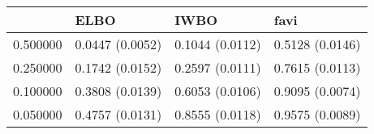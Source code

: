 \begin{tabular}{llll}
\toprule
 & ELBO & IWBO & favi \\
\midrule
0.500000 & 0.0447 (0.0052) & 0.1044 (0.0112) & 0.5128 (0.0146) \\
0.250000 & 0.1742 (0.0152) & 0.2597 (0.0111) & 0.7615 (0.0113) \\
0.100000 & 0.3808 (0.0139) & 0.6053 (0.0106) & 0.9095 (0.0074) \\
0.050000 & 0.4757 (0.0131) & 0.8555 (0.0118) & 0.9575 (0.0089) \\
\bottomrule
\end{tabular}
